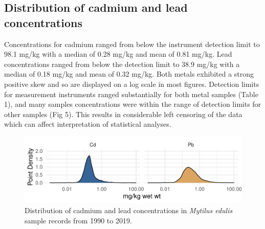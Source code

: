 \documentclass[
  12pt,
]{article}
\begin{document}
\hypertarget{distribution-of-cadmium-and-lead-concentrations}{%
\subsection{Distribution of cadmium and lead
concentrations}\label{distribution-of-cadmium-and-lead-concentrations}}

Concentrations for cadmium ranged from below the instrument detection
limit to 98.1 mg/kg with a median of 0.28 mg/kg and mean of 0.81 mg/kg.
Lead concentrations ranged from below the detection limit to 38.9 mg/kg
with a median of 0.18 mg/kg and mean of 0.32 mg/kg. Both metals
exhibited a strong positive skew and so are displayed on a log scale in
most figures. Detection limits for measurement instruments ranged
substantially for both metal samples (Table 1), and many samples
concentrations were within the range of detection limits for other
samples (Fig 5). This results in considerable left censoring of the data
which can affect interpretation of statistical analyses.

\begin{figure}
\centering
\includegraphics{McCrory_ENV972_Project_files/figure-latex/unnamed-chunk-5-1.pdf}
\caption{Distribution of cadmium and lead concentrations in
\emph{Mytilus edulis} sample records from 1990 to 2019.}
\end{figure}
\end{document}
